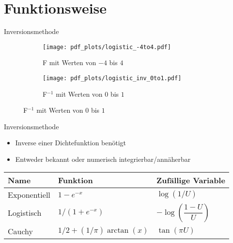 \section{Funktionsweise}

\begin{frame}{Inversionsmethode}
	\begin{figure}
		\begin{subfigure}{.45\textwidth}
			\centering
			\texttt{[image: pdf\_plots/logistic\_-4to4.pdf]}
            \caption{F mit Werten von $-4$ bis $4$}
		\end{subfigure}
		\begin{subfigure}{.45\textwidth}
			\centering
			\texttt{[image: pdf\_plots/logistic\_inv\_0to1.pdf]}
            \caption{F$^{-1}$ mit Werten von $0$ bis $1$}
		\end{subfigure}
	\end{figure}
\end{frame}

\begin{frame}{Inversionsmethode}
    \begin{itemize}
        \item Inverse einer Dichtefunktion benötigt 
        \item Entweder bekannt %
            oder numerisch integrierbar/annäherbar
    \end{itemize}
    \begin{table}%
        \centering
        \begin{tabular}{l|l|l}
            Name         & Funktion & Zufällige Variable \\
            \hline\hline %
            Exponentiell & $1 - e^{-x}$ & $\log(1/U)$ \\ %
            Logistisch   & $1 / (1 + e^{-x})$ & $-\log(\dfrac{1-U}{U})$ \\ %
            Cauchy       & $1/2 + (1/\pi) \arctan(x)$ & $\tan(\pi U)$
        \end{tabular}
        \label{tab:invFunctions}
    \end{table}
\end{frame}

